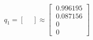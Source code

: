 \documentclass[preview]{standalone}
\begin{document}
\begin{center}
$q_1 = \begin{bmatrix}\
                    \
                \end{bmatrix} \approx \begin{bmatrix}\
                    0.996195 \\\
                    0.087156 \\\
                    0 \\\
                    0\
                \end{bmatrix}$
\end{center}
\end{document}

